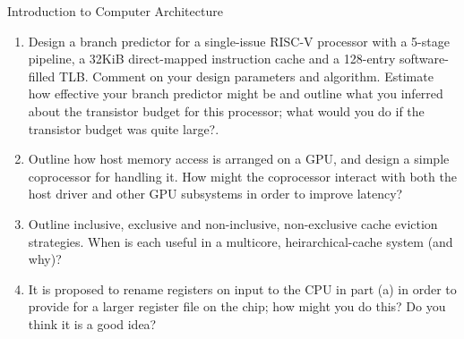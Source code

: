 \documentclass{tripos}
\begin{document}
\begin{question}[MockIB,year=2025,paper=2,question=5,author=rrw]{Introduction to Computer Architecture}

  \begin{enumerate}
  \item Design a branch predictor for a single-issue RISC-V processor
    with a 5-stage pipeline, a 32KiB direct-mapped instruction cache
    and a 128-entry software-filled TLB.  Comment on your design
    parameters and algorithm. Estimate how effective your branch
    predictor might be and outline what you inferred about the
    transistor budget for this processor; what would you do if the
    transistor budget was quite large?.  

  \item Outline how host memory access is arranged on a GPU, and design a simple
    coprocessor for handling it. How might the coprocessor interact with both the
    host driver and other GPU subsystems in order to improve latency?

  \item Outline inclusive, exclusive and non-inclusive, non-exclusive cache eviction strategies.
     When is each useful in a multicore, heirarchical-cache system (and why)?

   \item It is proposed to rename registers on input to the CPU in part (a) in order to provide for a
     larger register file on the chip; how might you do this? Do you think it is a good idea?
  \end{enumerate}

\end{question}
\eject
\end{document}
